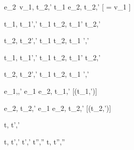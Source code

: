   {e_2\ {v_1},\sigma {\normalise} {t_2},{\sigma}'}
  {t_1 \Next e_2,\sigma \xrightarrow[]{\Continue} {t_2},{\sigma}'}
  [ = {v_1} \land \neg{}]


  {t_1,\sigma {} {t_1}',{\sigma}'}
  {t_1 \And t_2,\sigma {} {t_1}' \And t_2,{\sigma}'}

  {t_2,\sigma {} {t_2}',{\sigma}'}
  {t_1 \And t_2,\sigma {} t_1 ',{\sigma}'}


  {t_1,\sigma {} {t_1}',{\sigma}'}
  {t_1 \Or t_2,\sigma {} {t_1}' \Or t_2,{\sigma}'}

  {t_2,\sigma {} {t_2}',{\sigma}' }
  {t_1 \Or t_2,\sigma {} t_1 ',{\sigma}'}


  {e_1,\sigma {},{\sigma}'}
  {e_1 \Xor e_2,\sigma \xrightarrow[]{\Left} {t_1},{\sigma}'}
  [\neg\Failing({t_1},{\sigma}')]

  {e_2,\sigma {\normalise} {t_2},{\sigma}'}
  {e_1 \Xor e_2,\sigma \xrightarrow[]{\Right} {t_2},{\sigma}'}
  [\neg\Failing({t_2},{\sigma}')]




  {{t},{\sigma}  {t}',{\sigma}'}



  {t,\sigma {} {t}',{\sigma}' \Quad
   {t}',{\sigma}' {\normalise} {t}'',{\sigma}''}
  {t,\sigma {} {t}'',{\sigma}''}
